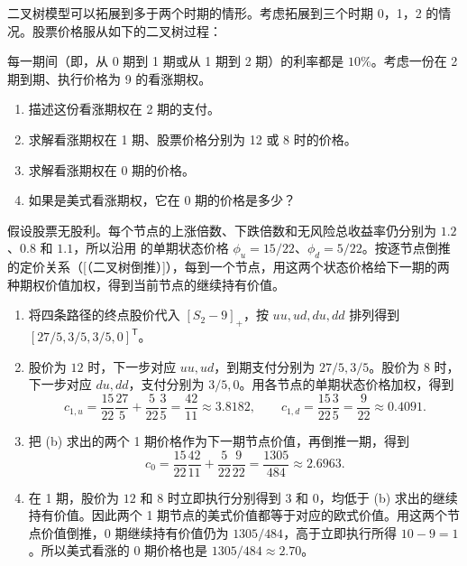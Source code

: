 \begin{problem}
\WJFiveProblem{} 二叉树模型可以拓展到多于两个时期的情形。考虑拓展到三个时期 0，1，2 的情况。股票价格服从如下的二叉树过程：
\begin{center}
\end{center}
每一期间（即，从 0 期到 1 期或从 1 期到 2 期）的利率都是 $10\%$。考虑一份在 2 期到期、执行价格为 9 的看涨期权。
\begin{enumerate}[label=(\alph*)]
    \item 描述这份看涨期权在 2 期的支付。
    \item 求解看涨期权在 1 期、股票价格分别为 12 或 8 时的价格。
    \item 求解看涨期权在 0 期的价格。
    \item 如果是美式看涨期权，它在 0 期的价格是多少？
\end{enumerate}
\end{problem}
\begin{solution}[blank-type=manual,blank-vsep=9\baselineskip]

假设股票无股利。每个节点的上涨倍数、下跌倍数和无风险总收益率仍分别为 $1.2$、$0.8$ 和 $1.1$，所以沿用 的单期状态价格 $\phi_u=15/22$、$\phi_d=5/22$。按逐节点倒推的定价关系\ifdefined\WJHandoutKnowledge（[（二叉树倒推）]）\fi，每到一个节点，用这两个状态价格给下一期的两种期权价值加权，得到当前节点的继续持有价值。
\begin{enumerate}[label=(\alph*)]
 \item 将四条路径的终点股价代入 $[S_2-9]_+$，按 $uu,ud,du,dd$ 排列得到 $[27/5,3/5,3/5,0]^{\mathsf T}$。
 \item 股价为 $12$ 时，下一步对应 $uu,ud$，到期支付分别为 $27/5,3/5$。股价为 $8$ 时，下一步对应 $du,dd$，支付分别为 $3/5,0$。用各节点的单期状态价格加权，得到
 \[
 c_{1,u}=\frac{15}{22}\frac{27}{5}+\frac5{22}\frac35=\frac{42}{11}\approx3.8182,
 \qquad
 c_{1,d}=\frac{15}{22}\frac35=\frac9{22}\approx0.4091.
 \]
 \item 把 (b) 求出的两个 1 期价格作为下一期节点价值，再倒推一期，得到
 \[
 c_0=\frac{15}{22}\frac{42}{11}+\frac5{22}\frac9{22}
 =\frac{1305}{484}\approx2.6963.
 \]
 \item 在 1 期，股价为 $12$ 和 $8$ 时立即执行分别得到 $3$ 和 $0$，均低于 (b) 求出的继续持有价值。因此两个 1 期节点的美式价值都等于对应的欧式价值。用这两个节点价值倒推，0 期继续持有价值仍为 $1305/484$，高于立即执行所得 $10-9=1$。所以美式看涨的 0 期价格也是 $1305/484\approx2.70$。
\end{enumerate}
\end{solution}

